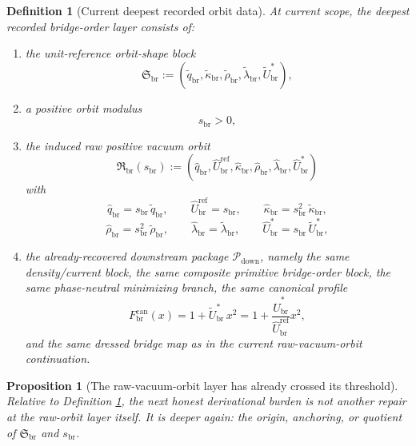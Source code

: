 \documentclass[11pt]{article}
\newcommand{\RespShapeReadout}{\widetilde q_{\mathrm{br}}}
\newcommand{\RespShapeCov}{\widetilde\kappa_{\mathrm{br}}}
\newcommand{\RespShapeRelax}{\widetilde\rho_{\mathrm{br}}}
\newcommand{\RespShapeWell}{\widetilde\lambda_{\mathrm{br}}}
\newcommand{\RespShapeEq}{\widetilde U_{\mathrm{br}}^{\ast}}
\newcommand{\RespRawReadout}{\widehat q_{\mathrm{br}}}
\newcommand{\RespRawRef}{\widehat U_{\mathrm{br}}^{\mathrm{ref}}}
\newcommand{\RespRawCov}{\widehat\kappa_{\mathrm{br}}}
\newcommand{\RespRawRelax}{\widehat\rho_{\mathrm{br}}}
\newcommand{\RespRawWell}{\widehat\lambda_{\mathrm{br}}}
\newcommand{\RespRawEq}{\widehat U_{\mathrm{br}}^{\ast}}
\newcommand{\CurvProfileCan}{F_{\mathrm{br}}^{\mathrm{can}}}
\newcommand{\DownPkg}{\mathscr P_{\mathrm{down}}}
\newcommand{\ShapeTuple}{\mathfrak S_{\mathrm{br}}}
\newcommand{\RawTuple}{\mathfrak R_{\mathrm{br}}}
\newcommand{\ScaleMod}{s_{\mathrm{br}}}
\newtheorem{definition}{Definition}
\newtheorem{proposition}{Proposition}
\begin{document}
\begin{definition}[Current deepest recorded orbit data]
\label{def:current}
At current scope, the deepest recorded bridge-order layer consists of:
\begin{enumerate}
    \item the unit-reference orbit-shape block
    \begin{equation}
    \ShapeTuple
    :=
    (\RespShapeReadout,\RespShapeCov,\RespShapeRelax,\RespShapeWell,\RespShapeEq),
    \label{eq:shapetuple}
    \end{equation}
    \item a positive orbit modulus
    \begin{equation}
    \ScaleMod>0,
    \label{eq:scalemod}
    \end{equation}
    \item the induced raw positive vacuum orbit
    \begin{equation}
    \RawTuple(\ScaleMod)
    :=
    (\RespRawReadout,\RespRawRef,\RespRawCov,\RespRawRelax,\RespRawWell,\RespRawEq)
    \label{eq:rawtuple}
    \end{equation}
    with
    \begin{equation}
    \RespRawReadout=\ScaleMod\,\RespShapeReadout,
    \qquad
    \RespRawRef=\ScaleMod,
    \qquad
    \RespRawCov=\ScaleMod^2\,\RespShapeCov,
    \label{eq:rawliftA}
    \end{equation}
    \begin{equation}
    \RespRawRelax=\ScaleMod^2\,\RespShapeRelax,
    \qquad
    \RespRawWell=\RespShapeWell,
    \qquad
    \RespRawEq=\ScaleMod\,\RespShapeEq,
    \label{eq:rawliftB}
    \end{equation}
    \item the already-recovered downstream package \(\DownPkg\), namely the same density/current block, the same composite primitive bridge-order block, the same phase-neutral minimizing branch, the same canonical profile
    \begin{equation}
    \CurvProfileCan(x)=1+\RespShapeEq\,x^2
    =
    1+\frac{\RespRawEq}{\RespRawRef}x^2,
    \label{eq:canonicalprofile}
    \end{equation}
    and the same dressed bridge map as in the current raw-vacuum-orbit continuation.
\end{enumerate}
\end{definition}

\begin{proposition}[The raw-vacuum-orbit layer has already crossed its threshold]
\label{prop:nosamelayer}
Relative to Definition \ref{def:current}, the next honest derivational burden is not another repair at the raw-orbit layer itself. It is deeper again: the origin, anchoring, or quotient of \(\ShapeTuple\) and \(\ScaleMod\).
\end{proposition}
\end{document}
